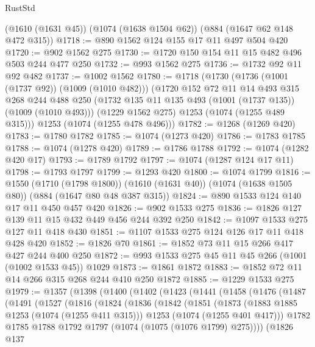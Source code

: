 \begin{lexlean}{RustStd}
\begin{coremodule}
    (@1610 (@1631 @45))
    (@1074 (@1638 @1504 @62))
    (@884 (@1647 @62 @148 @472 @315))
@1718 := @890 @1562 @124 @155 @17 @11 @497 @504 @420
@1720 := @902 @1562 @275
@1730 := @1720 @150 @154 @11 @15 @482 @496 @503 @244 @477 @250
@1732 := @993 @1562 @275
@1736 := @1732 @92 @11 @92 @482
@1737 := @1002 @1562
@1780 := @1718
    (@1730
      (@1736 (@1001 (@1737 @92)) (@1009 (@1010 @482)))
      (@1720
        @152
        @72
        @11
        @14
        @493
        @315
        @268
        @244
        @488
        @250
        (@1732 @135 @11 @135 @493 (@1001 (@1737 @135)) (@1009 (@1010 @493)))
        (@1229 @1562 @275)
        @1253
        (@1074 (@1255 @489 @315)))
      @1253
      (@1074 (@1255 @478 @496)))
@1782 := @1268 (@1269 @420)
@1783 := @1780 @1782
@1785 := @1074 (@1273 @420)
@1786 := @1783 @1785
@1788 := @1074 (@1278 @420)
@1789 := @1786 @1788
@1792 := @1074 (@1282 @420 @17)
@1793 := @1789 @1792
@1797 := @1074 (@1287 @124 @17 @11)
@1798 := @1793 @1797
@1799 := @1293 @420
@1800 := @1074 @1799
@1816 := @1550
    (@1710 (@1798 @1800))
    (@1610 (@1631 @40))
    (@1074 (@1638 @1505 @80))
    (@884 (@1647 @80 @48 @387 @315))
@1824 := @890 @1533 @124 @140 @17 @11 @450 @457 @420
@1826 := @902 @1533 @275
@1836 := @1826 @127 @139 @11 @15 @432 @449 @456 @244 @392 @250
@1842 := @1097 @1533 @275 @127 @11 @418 @430
@1851 := @1107 @1533 @275 @124 @126 @17 @11 @418 @428 @420
@1852 := @1826 @70
@1861 := @1852 @73 @11 @15 @266 @417 @427 @244 @400 @250
@1872 := @993 @1533 @275 @45 @11 @45 @266 (@1001 (@1002 @1533 @45)) @1029
@1873 := @1861 @1872
@1883 := @1852 @72 @11 @14 @266 @315 @268 @244 @410 @250 @1872
@1885 := @1229 @1533 @275
@1979 := @1357
    (@1398
      (@1400
        (@1402
          (@1423
            (@1441
              (@1458
                (@1476
                  (@1487
                    (@1491
                      (@1527
                        (@1816
                          (@1824
                            (@1836
                              (@1842
                                (@1851
                                  (@1873
                                    (@1883 @1885 @1253 (@1074 (@1255 @411 @315)))
                                    @1253
                                    (@1074 (@1255 @401 @417)))
                                  @1782
                                  @1785
                                  @1788
                                  @1792
                                  @1797
                                  (@1074 (@1075 (@1076 @1799) @275))))
                              (@1826
                                @137

\end{coremodule}
\end{lexlean}
